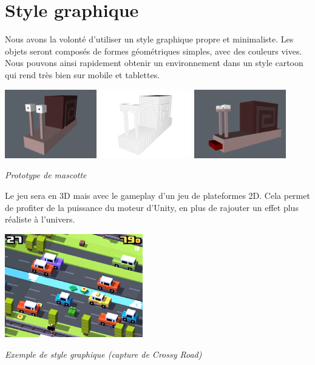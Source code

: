 \documentclass[a4paper,11pt]{article}
\begin{document}
\section{Style graphique}
Nous avons la volonté d’utiliser un style graphique propre et minimaliste. Les objets seront composés de formes géométriques simples, avec des couleurs vives. Nous pouvons ainsi rapidement obtenir un environnement dans un style cartoon qui rend très bien sur mobile et tablettes.
\linebreak 
\begin{center}
\includegraphics[width=4cm]{Escargal.png} 
\includegraphics[width=4cm]{EscargalCellulo.png} 
\includegraphics[width=4cm]{Escargal2.png} 
\end{center}
\begin{center}
\textsl{Prototype de mascotte}
\end{center}
\medskip
Le jeu sera en 3D mais avec le gameplay d’un jeu de plateformes 2D. Cela permet de profiter de la puissance du moteur d’Unity, en plus de rajouter un effet plus réaliste à l’univers.
\begin{center}
\includegraphics[width=6cm]{gsmarena_0031.jpg} 
\end{center}
\begin{center}
\textsl{Exemple de style graphique (capture de Crossy Road)}
\end{center}
\end{document}
